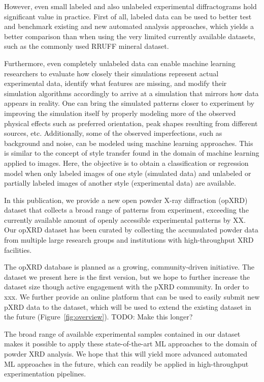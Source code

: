 However, even small labeled and also unlabeled experimental diffractograms hold significant value in practice. First of all, labeled data can be used to better test and benchmark existing and new automated analysis approaches, which yields a better comparison than when using the very limited currently available datasets, such as the commonly used RRUFF mineral dataset.

Furthermore, even completely unlabeled data can enable machine learning researchers to evaluate how closely their simulations represent actual experimental data, identify what features are missing, and modify their simulation algorithms accordingly to arrive at a simulation that mirrors how data appears in reality.
One can bring the simulated patterns closer to experiment by improving the simulation itself by properly modeling more of the observed physical effects such as preferred orientation, peak shapes resulting from different sources, etc.
Additionally, some of the observed imperfections, such as background and noise, can be modeled using machine learning approaches.
This is similar to the concept of style transfer\cite{Gatys2016,Ganin2015} found in the domain of machine learning applied to images.
Here, the objective is to obtain a classification or regression model when only labeled images of one style (simulated data) and unlabeled or partially labeled images of another style (experimental data) are available.

In this publication, we provide a new open powder X-ray diffraction (opXRD) dataset that collects a broad range of patterns from experiment, exceeding the currently available amount of openly accessible experimental patterns by XX.
Our opXRD dataset has been curated by collecting the accumulated powder data from multiple large research groups and institutions with high-throughput XRD facilities.

The opXRD database is planned as a growing, community-driven initiative. The dataset we present here is the first version, but we hope to further increase the dataset size though active engagement with the pXRD community. In order to xxx. We further provide an online platform that can be used to easily submit new pXRD data to the dataset, which will be used to extend the existing dataset in the future (Figure~\ref{fig:overview}).
TODO: Make this longer?





The broad range of available experimental samples contained in our dataset makes it possible to apply these state-of-the-art ML approaches to the domain of powder XRD analysis.
We hope that this will yield more advanced automated ML approaches in the future, which can readily be applied in high-throughput experimentation pipelines.


